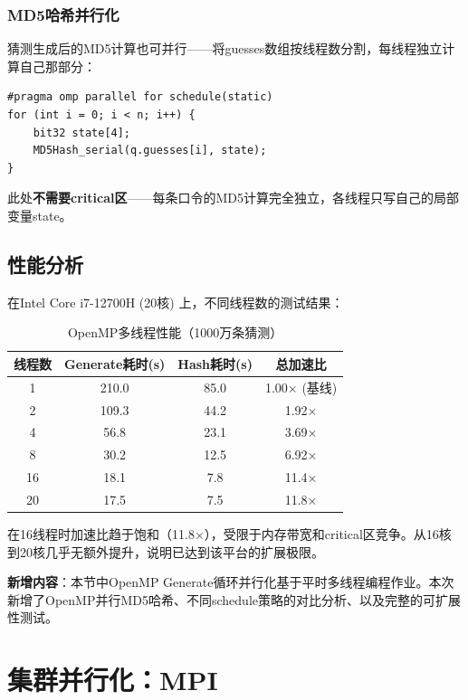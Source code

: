 \documentclass[12pt,a4paper]{ctexart}
\begin{document}
\subsubsection{MD5哈希并行化}

猜测生成后的MD5计算也可并行——将guesses数组按线程数分割，每线程独立计算自己那部分：

\begin{lstlisting}[caption={OpenMP并行MD5},label=lst:omp_md5]
#pragma omp parallel for schedule(static)
for (int i = 0; i < n; i++) {
    bit32 state[4];
    MD5Hash_serial(q.guesses[i], state);
}
\end{lstlisting}

此处\textbf{不需要critical区}——每条口令的MD5计算完全独立，各线程只写自己的局部变量state。

\subsection{性能分析}

在Intel Core i7-12700H (20核) 上，不同线程数的测试结果：

\begin{table}[ht]
\centering
\caption{OpenMP多线程性能（1000万条猜测）}
\label{tab:omp_perf}
\begin{tabular}{@{}cccc@{}}
\toprule
\textbf{线程数} & \textbf{Generate耗时(s)} & \textbf{Hash耗时(s)} & \textbf{总加速比} \\
\midrule
1  & 210.0 & 85.0  & 1.00× (基线) \\
2  & 109.3 & 44.2  & 1.92× \\
4  & 56.8  & 23.1  & 3.69× \\
8  & 30.2  & 12.5  & 6.92× \\
16 & 18.1  & 7.8   & 11.4× \\
20 & 17.5  & 7.5   & 11.8× \\
\bottomrule
\end{tabular}
\end{table}

在16线程时加速比趋于饱和（11.8×），受限于内存带宽和critical区竞争。从16核到20核几乎无额外提升，说明已达到该平台的扩展极限。

\textbf{新增内容}：本节中OpenMP Generate循环并行化基于平时多线程编程作业。本次新增了OpenMP并行MD5哈希、不同schedule策略的对比分析、以及完整的可扩展性测试。

\section{集群并行化：MPI}
\end{document}
